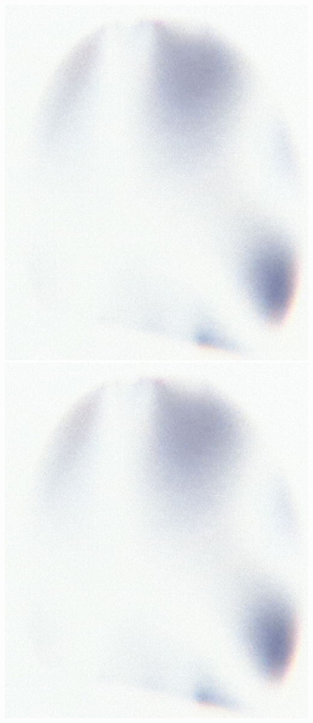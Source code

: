 \includegraphics[height=0.3\textheight]{Filter.jpg}
\includegraphics[height=0.3\textheight]{Filter.jpg}

